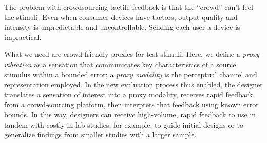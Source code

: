     
    The  problem with crowdsourcing tactile feedback is that the ``crowd''  can't feel the stimuli. Even when consumer devices have tactors,  output quality and intensity is unpredictable and uncontrollable.
    Sending each user a device is impractical.
    
    

    
   What we need are crowd-friendly proxies for test stimuli.
    Here, we define a \emph{proxy vibration} as a sensation that communicates key characteristics of a source stimulus within a bounded error; a \emph{proxy modality} is the perceptual channel and representation employed.
    In the new evaluation process thus enabled, the designer translates a sensation of interest into a proxy modality, receives rapid feedback from a crowd-sourcing platform, then interprets that feedback using known error bounds.
    In this way, designers can receive high-volume, rapid feedback to use in tandem with costly in-lab studies, for example, to guide initial designs or to generalize findings from smaller studies with a larger sample.
    
    
      
